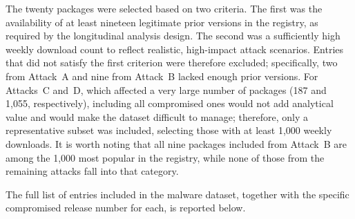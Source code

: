 The twenty packages were selected based on two criteria.
The first was the availability of at least nineteen legitimate prior versions in the registry,
as required by the longitudinal analysis design.
The second was a sufficiently high weekly download count to reflect realistic, high-impact attack scenarios.
Entries that did not satisfy the first criterion were therefore excluded;
specifically, two from Attack~A and nine from Attack~B lacked enough prior versions.
For Attacks~C and~D, which affected a very large number of packages (187 and 1,055, respectively),
including all compromised ones would not add analytical value and would make the dataset difficult to manage;
therefore, only a representative subset was included, 
selecting those with at least 1,000 weekly downloads.
It is worth noting that all nine packages included from Attack~B are among the 1,000 most popular in the registry, 
while none of those from the remaining attacks fall into that category.

The full list of entries included in the malware dataset, 
together with the specific compromised release number for each, is reported below.

